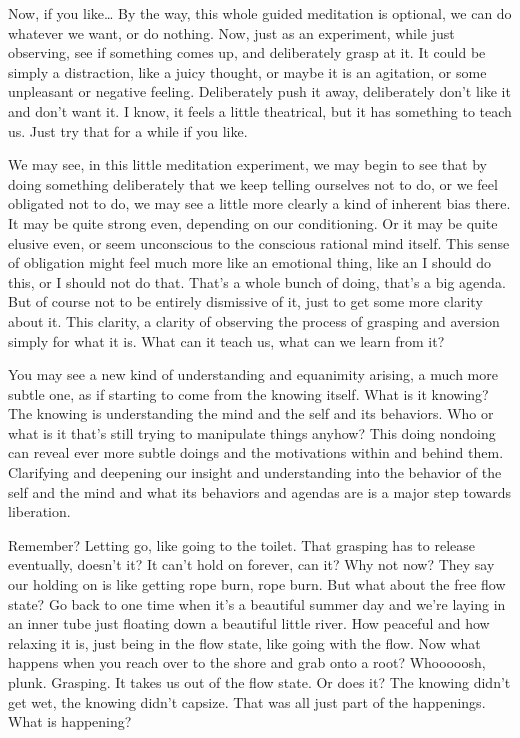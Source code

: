 \documentclass[12pt,openany]{book}
\begin{document}
Now, if you like… By the way, this whole guided meditation is optional, we can do whatever we want, or do nothing. Now, just as an experiment, while just observing, see if something comes up, and deliberately grasp at it. It could be simply a distraction, like a juicy thought, or maybe it is an agitation, or some unpleasant or negative feeling. Deliberately push it away, deliberately don’t like it and don't want it. I know, it feels a little theatrical, but it has something to teach us. Just try that for a while if you like.

We may see, in this little meditation experiment, we may begin to see that by doing something deliberately that we keep telling ourselves not to do, or we feel obligated not to do, we may see a little more clearly a kind of inherent bias there. It may be quite strong even, depending on our conditioning. Or it may be quite elusive even, or seem unconscious to the conscious rational mind itself. This sense of obligation might feel much more like an emotional thing, like an I should do this, or I should not do that. That's a whole bunch of doing, that's a big agenda. But of course not to be entirely dismissive of it, just to get some more clarity about it. This clarity, a clarity of observing the process of grasping and aversion simply for what it is. What can it teach us, what can we learn from it?

You may see a new kind of understanding and equanimity arising, a much more subtle one, as if starting to come from the knowing itself. What is it knowing? The knowing is understanding the mind and the self and its behaviors. Who or what is it that's still trying to manipulate things anyhow? This doing nondoing can reveal ever more subtle doings and the motivations within and behind them. \linebreak Clarifying and deepening our insight and understanding into the behavior of the self and the mind and what its behaviors and agendas are is a major step towards liberation. 

Remember? Letting go, like going to the toilet. That grasping has to release eventually, doesn’t it? It can’t hold on forever, can it? Why not now? They say our holding on is like getting rope burn, rope burn. But what about the free flow state? Go back to one time when it's a beautiful summer day and we’re laying in an inner tube just floating down a beautiful little river. How peaceful and how relaxing it is, just being  in the flow state, like going with the flow. Now what happens when you reach over to the shore and grab onto a root? Whooooosh, plunk. Grasping. It takes us out of the flow state. Or does it? The knowing didn't get wet, the knowing didn’t capsize. That was all just part of the happenings. What is happening?
\end{document}
